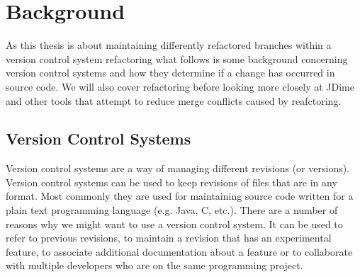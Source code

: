 \chapter{Background}

As this thesis is about maintaining differently refactored branches within a version control system refactoring what follows is some background concerning version control systems and how they determine if a change has occurred in source code.  We will also cover refactoring before looking more closely at JDime and other tools that attempt to reduce merge conflicts caused by reafctoring.  

\section{Version Control Systems}
Version control systems are a way of managing different revisions (or versions). Version control systems can be used to keep revisions of files that are in any format. Most commonly they are used for maintaining source code written for a plain text programming language (e.g. Java, C, etc.). There are a number of reasons why we might want to use a version control system. It can be used to refer to previous revisions, to maintain a revision that has an experimental feature, to associate additional documentation about a feature or to collaborate with multiple developers who are on the same programming project.

